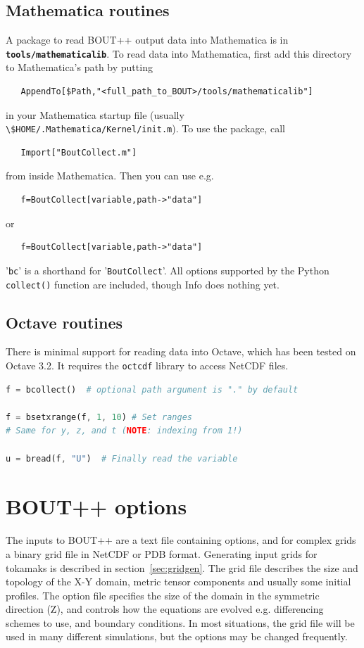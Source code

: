 \documentclass[12pt]{article}
\newcommand{\file}[1]{\texttt{\bf #1}}
\begin{document}
\subsection{Mathematica routines}

A package to read BOUT++ output data into Mathematica is in \file{tools/mathematicalib}.
To read data into Mathematica, first add this directory to Mathematica's path by putting
\begin{verbatim}
   AppendTo[$Path,"<full_path_to_BOUT>/tools/mathematicalib"]
\end{verbatim}
in your Mathematica startup file (usually \lstinline!\$HOME/.Mathematica/Kernel/init.m!). To use
the package, call
\begin{verbatim}
   Import["BoutCollect.m"]
\end{verbatim}
from inside Mathematica. Then you can use e.g.
\begin{verbatim}
   f=BoutCollect[variable,path->"data"]
\end{verbatim}
or
\begin{verbatim}
   f=BoutCollect[variable,path->"data"]
\end{verbatim}
'\lstinline!bc!' is a shorthand for '\lstinline!BoutCollect!'. All options supported by the Python \lstinline!collect()!
function are included, though Info does nothing yet.

\subsection{Octave routines}

There is minimal support for reading data into Octave, which has been tested on
Octave 3.2. It requires the \texttt{octcdf} library to access NetCDF files.

\begin{lstlisting}[language=octave,numbers=none]
f = bcollect()  # optional path argument is "." by default

f = bsetxrange(f, 1, 10) # Set ranges
# Same for y, z, and t (NOTE: indexing from 1!)

u = bread(f, "U")  # Finally read the variable
\end{lstlisting}

\section{BOUT++ options}
\label{sec:options}

The inputs to BOUT++ are a text file containing options, and for complex
grids a binary grid file in NetCDF or PDB format. Generating input grids for tokamaks is
described in section~\ref{sec:gridgen}. The grid file describes the size
and topology of the X-Y domain, metric tensor components and usually
some initial profiles. The option file specifies the size of the domain
in the symmetric direction (Z), and controls how the equations are evolved
e.g. differencing schemes to use, and boundary conditions.
In most situations, the grid file will be used in many different simulations,
but the options may be changed frequently.
\end{document}
